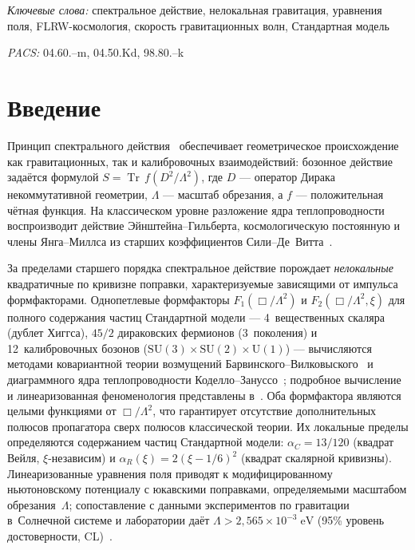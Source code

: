 \documentclass[12pt,a4paper]{article}
\newcommand{\Tr}{\operatorname{Tr}}
\newcommand{\Lam}{\Lambda}
\theoremstyle{plain}
\theoremstyle{definition}
\begin{document}
\vspace{6pt}
\noindent\textit{Ключевые слова:}
спектральное действие, нелокальная гравитация, уравнения поля,
FLRW-космология, скорость гравитационных волн, Стандартная модель

\noindent\textit{PACS:} 04.60.--m, 04.50.Kd, 98.80.--k

\tableofcontents

\section{Введение}
\label{sec:intro}

Принцип спектрального действия~\cite{Chamseddine:1996zu,Chamseddine:2006ep}
обеспечивает геометрическое происхождение как гравитационных, так и
калибровочных взаимодействий: бозонное действие задаётся формулой
$S = \Tr\,f(D^2/\Lam^2)$, где $D$ --- оператор Дирака некоммутативной
геометрии, $\Lam$ --- масштаб обрезания, а $f$ --- положительная чётная
функция.  На классическом уровне разложение ядра теплопроводности
воспроизводит действие Эйнштейна--Гильберта, космологическую постоянную и
члены Янга--Миллса из старших коэффициентов
Сили--Де~Витта~\cite{Chamseddine:2010ud,vanSuijlekom:2014pya}.

За пределами старшего порядка спектральное действие порождает
\emph{нелокальные} квадратичные по кривизне поправки, характеризуемые
зависящими от импульса формфакторами.  Однопетлевые формфакторы
$F_1(\Box/\Lam^2)$ и $F_2(\Box/\Lam^2,\xi)$ для полного содержания
частиц Стандартной модели ---
4~вещественных скаляра (дублет Хиггса), $45/2$ дираковских
фермионов (3~поколения) и 12~калибровочных бозонов
($\mathrm{SU}(3) \times \mathrm{SU}(2) \times \mathrm{U}(1)$) ---
вычисляются методами ковариантной теории возмущений
Барвинского--Вилковыского~\cite{Barvinsky:1985an,Barvinsky:1987uw}
и диаграммного ядра теплопроводности
Коделло--Зануссо~\cite{Codello:2012kq}; подробное вычисление
и линеаризованная феноменология представлены
в~\cite{Alfyorov:2026ff,Alfyorov:2026ss}.
Оба формфактора являются целыми функциями от $\Box/\Lam^2$, что
гарантирует отсутствие дополнительных полюсов пропагатора сверх полюсов
классической теории.  Их локальные пределы определяются содержанием частиц
Стандартной модели: $\alpha_C = 13/120$ (квадрат Вейля,
$\xi$-независим) и $\alpha_R(\xi) = 2(\xi-1/6)^2$ (квадрат скалярной
кривизны).  Линеаризованные уравнения поля приводят к модифицированному
ньютоновскому потенциалу с юкавскими поправками, определяемыми масштабом
обрезания~$\Lam$; сопоставление с данными экспериментов по гравитации
в~Солнечной системе и лаборатории даёт
$\Lam > 2{,}565 \times 10^{-3}\;\mathrm{eV}$
(95\% уровень достоверности, CL)~\cite{Alfyorov:2026ss}.
\end{document}
